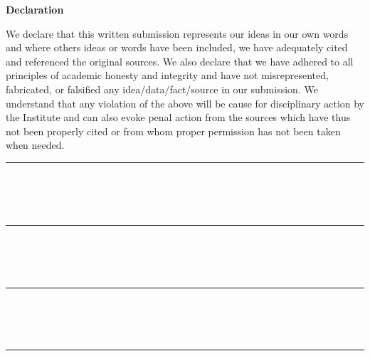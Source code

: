\documentclass[12pt]{article}
\begin{document}
\begin{center}
    {\Large \textbf{Declaration}}
\end{center}

\vspace{0.5cm}

\justifying

We declare that this written submission represents our ideas in our own
words and where others ideas or words have been included, we have adequately
cited and referenced the original sources. We also declare that we have adhered to
all principles of academic honesty and integrity and have not misrepresented, 
fabricated, or falsified any idea/data/fact/source in our submission. We understand
that any violation of the above will be cause for disciplinary action by the Institute
and can also evoke penal action from the sources which have thus not been properly
cited or from whom proper permission has not been taken when needed.    

\vspace{2cm}

\begin{flushright}
    \rule{6cm}{0.5pt} \\[-0.4cm]\\[0.1cm]
     \\[1cm]
    \rule{6cm}{0.5pt} \\[-0.4cm]\\[0.1cm]
    \\[1cm]
    \rule{6cm}{0.5pt} \\[-0.4cm]\\[0.1cm]
    \\
\end{flushright}

\vspace{2cm}

\noindent
{} \rule{5cm}{0.4pt} \\[2em]
\end{document}
